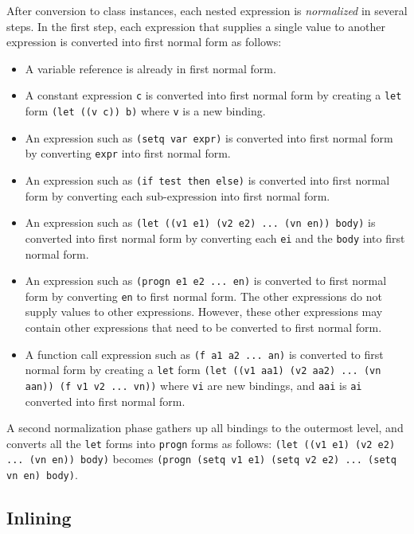 \documentclass{article}
\begin{document}
After conversion to class instances, each nested expression is
\emph{normalized} in several steps.  In the first step, each
expression that supplies a single value to another expression is
converted into first normal form as follows:

\begin{itemize}
\item A variable reference is already in first normal form.
\item A constant expression \texttt{c} is converted into first normal
  form by creating a \texttt{let} form \texttt{(let ((v c)) b)} where
  \texttt{v} is a new binding. 
\item An expression such as \texttt{(setq var expr)} is converted into
  first normal form by converting \texttt{expr} into first normal
  form.
\item An expression such as \texttt{(if test then else)} is converted
  into first normal form by converting each sub-expression into first
  normal form.
\item An expression such as \texttt{(let ((v1 e1) (v2 e2) ... (vn en))
  body)} is converted into first normal form by converting each
  \texttt{ei} and the \texttt{body} into first normal form.
\item An expression such as \texttt{(progn e1 e2 ... en)} is converted
  to first normal form by converting \texttt{en} to first normal
  form.  The other expressions do not supply values to other
  expressions.  However, these other expressions may contain other
  expressions that need to be converted to first normal form.
\item A function call expression such as \texttt{(f a1 a2 ... an)} is
  converted to first normal form by creating a \texttt{let} form
  \texttt{(let ((v1 aa1) (v2 aa2) ... (vn aan)) (f v1 v2 ... vn))}
  where \texttt{vi} are new bindings, and \texttt{aai} is \texttt{ai}
  converted into first normal form.
\end{itemize}

A second normalization phase gathers up all bindings to the outermost
level, and converts all the \texttt{let} forms into \texttt{progn}
forms as follows: \texttt{(let ((v1 e1) (v2 e2) ... (vn en)) body)}
becomes \texttt{(progn (setq v1 e1) (setq v2 e2) ... (setq vn en)
  body)}.

\subsection{Inlining}
\label{section-inlining}
\end{document}
